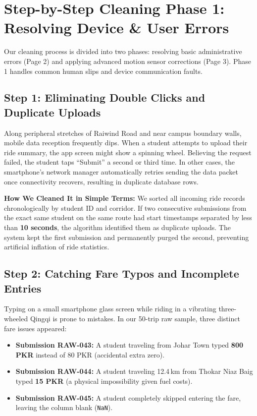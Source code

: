 \documentclass[10pt, a4paper]{article}
\begin{document}
\section{Step-by-Step Cleaning Phase 1: Resolving Device \& User Errors}

Our cleaning process is divided into two phases: resolving basic administrative errors (Page 2) and applying advanced motion sensor corrections (Page 3). Phase 1 handles common human slips and device communication faults.

\subsection{Step 1: Eliminating Double Clicks and Duplicate Uploads}
\begin{stepbox}
Along peripheral stretches of Raiwind Road and near campus boundary walls, mobile data reception frequently dips. When a student attempts to upload their ride summary, the app screen might show a spinning wheel. Believing the request failed, the student taps ``Submit'' a second or third time. In other cases, the smartphone's network manager automatically retries sending the data packet once connectivity recovers, resulting in duplicate database rows.
\end{stepbox}

\textbf{How We Cleaned It in Simple Terms:}
We sorted all incoming ride records chronologically by student ID and corridor. If two consecutive submissions from the exact same student on the same route had start timestamps separated by less than \textbf{10 seconds}, the algorithm identified them as duplicate uploads. The system kept the first submission and permanently purged the second, preventing artificial inflation of ride statistics.

\subsection{Step 2: Catching Fare Typos and Incomplete Entries}
\begin{stepbox}
Typing on a small smartphone glass screen while riding in a vibrating three-wheeled Qingqi is prone to mistakes. In our 50-trip raw sample, three distinct fare issues appeared:
\begin{itemize}\setlength{\itemsep}{0.8pt}\setlength{\parskip}{0pt}
  \item \textbf{Submission RAW-043:} A student traveling from Johar Town typed \textbf{800 PKR} instead of 80 PKR (accidental extra zero).
  \item \textbf{Submission RAW-044:} A student traveling 12.4\,km from Thokar Niaz Baig typed \textbf{15 PKR} (a physical impossibility given fuel costs).
  \item \textbf{Submission RAW-045:} A student completely skipped entering the fare, leaving the column blank (\texttt{NaN}).
\end{itemize}
\end{stepbox}
\end{document}
